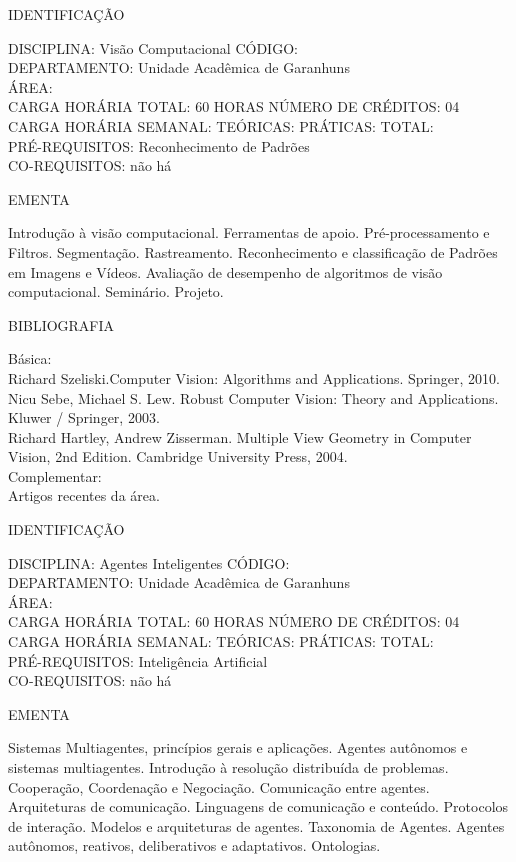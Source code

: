 \documentclass[
	12pt,				%
	openright,			%
  oneside,     %
	a4paper,			%
	chapter=TITLE,		%
	english,			%
	french,				%
	spanish,			%
	brazil				%
	]{abntex2}
\begin{document}
\begin{apendicesenv}
\newpage IDENTIFICAÇÃO

DISCIPLINA: Visão Computacional CÓDIGO:\\ 
DEPARTAMENTO: Unidade Acadêmica de Garanhuns\\
ÁREA: \\
CARGA HORÁRIA TOTAL: 60 HORAS NÚMERO DE CRÉDITOS: 04\\
CARGA HORÁRIA SEMANAL: TEÓRICAS: PRÁTICAS: TOTAL: \\
PRÉ-REQUISITOS: Reconhecimento de Padrões\\
CO-REQUISITOS: não há

EMENTA 

Introdução à visão computacional. Ferramentas de apoio.
Pré-processamento e Filtros. Segmentação. Rastreamento. Reconhecimento
e classificação de Padrões em Imagens e Vídeos. Avaliação de desempenho
de algoritmos de visão computacional. Seminário. Projeto.

BIBLIOGRAFIA 

Básica:\\
Richard Szeliski.Computer Vision: Algorithms and Applications. Springer,
2010.\\
Nicu Sebe, Michael S. Lew. Robust Computer Vision: Theory and
Applications. Kluwer / Springer, 2003.\\
Richard Hartley, Andrew Zisserman. Multiple View Geometry in Computer
Vision, 2nd Edition. Cambridge University Press, 2004.\\
Complementar:\\
Artigos recentes da área.

\newpage IDENTIFICAÇÃO

DISCIPLINA: Agentes Inteligentes CÓDIGO:\\ 
DEPARTAMENTO: Unidade Acadêmica de Garanhuns\\
ÁREA: \\
CARGA HORÁRIA TOTAL: 60 HORAS NÚMERO DE CRÉDITOS: 04\\
CARGA HORÁRIA SEMANAL: TEÓRICAS: PRÁTICAS: TOTAL: \\
PRÉ-REQUISITOS: Inteligência Artificial\\
CO-REQUISITOS: não há

EMENTA 

Sistemas Multiagentes, princípios gerais e aplicações. Agentes autônomos
e sistemas multiagentes. Introdução à resolução distribuída de
problemas. Cooperação, Coordenação e Negociação. Comunicação entre
agentes. Arquiteturas de comunicação. Linguagens de comunicação e
conteúdo. Protocolos de interação. Modelos e arquiteturas de agentes.
Taxonomia de Agentes. Agentes autônomos, reativos, deliberativos e
adaptativos. Ontologias.


\end{apendicesenv}
\end{document}
